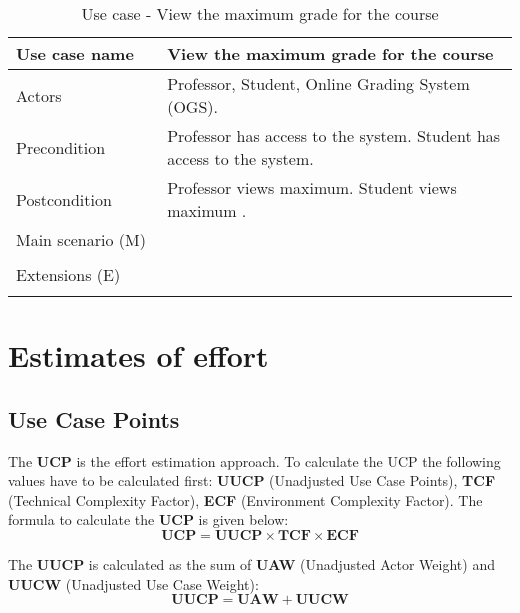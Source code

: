 \documentclass[12pt]{article}
\newcommand\tabularhead[1]{
\begin{table}[h]
  \caption{Use case - #1}
  \begin{tabular}{|p{0.3\linewidth}|p{0.7\linewidth}|}
    \hline
    \textbf{Use case name} & \textbf{#1} \\
    \hline}
\newcommand\addrow[2]{#1 &#2\\ \hline}
\newcommand\adddoublerow[2]{\begin{minipage}[t][][t]{2.5cm}#1\end{minipage}%
    &\begin{minipage}[t][][t]{\linewidth}
     \begin{itemize}\setlength{\itemsep}{0pt}%
        #2     
     \end{itemize}
     \end{minipage}\\ \hline}
\newcommand\addmulrow[2]{ \begin{minipage}[t][][t]{2.5cm}#1\end{minipage}%
     &\begin{minipage}[t][][t]{\linewidth}
      \begin{enumerate}\setlength{\itemsep}{0pt}%
        #2   
      \end{enumerate}
      \end{minipage}\\ \hline}
\newenvironment{usecase}{\tabularhead}
{\hline\end{tabular}\end{table}}
\begin{document}
\begin{usecase}{View the maximum grade for the course}
    \addrow{Actors}{Professor, Student, Online Grading System (OGS).}
    \addrow{Precondition}{Professor has access to the system. Student has access to the system.}
    \addrow{Postcondition}{Professor views maximum. Student views maximum .}
    \addmulrow{Main scenario (M)}{
        \item Professor or Student logins to the system.
        \item The system shows the list of available courses for the user (Professor or Student).
        \item Professor or Student chooses the desirable course.
        \item The system shows the maximum grade for the course.\\
    }
    \adddoublerow{Extensions (E)}{
        \item[] 1.1. Professor or Student entered the wrong credentials.
        \item[] 1.2. Go to 1.\\
    }
\end{usecase}
\newpage
\section{Estimates of effort}
\subsection{Use Case Points}
The \textbf{UCP} is the effort estimation approach. To calculate the UCP the following values have to be calculated first: \textbf{UUCP} (Unadjusted Use Case Points), \textbf{TCF} (Technical Complexity Factor), \textbf{ECF} (Environment Complexity Factor). The formula to calculate the \textbf{UCP} is given below:\\
\begin{equation}
    \textbf{UCP} = \textbf{UUCP} \times \textbf{TCF} \times \textbf{ECF}
\end{equation}

The \textbf{UUCP} is calculated as the sum of \textbf{UAW} (Unadjusted Actor Weight)
and \textbf{UUCW} (Unadjusted Use Case Weight):\\
\begin{equation}
    \textbf{UUCP} = \textbf{UAW} + \textbf{UUCW}
\end{equation}
\end{document}
